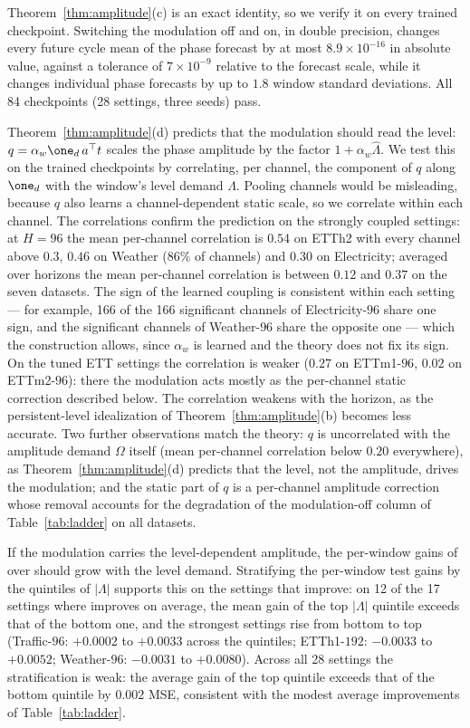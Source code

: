 {
Theorem~\ref{thm:amplitude}(c) is an exact identity, so we verify it on every trained \sysLA checkpoint. Switching the modulation off and on, in double precision, changes every future cycle mean of the phase forecast by at most $8.9\times10^{-16}$ in absolute value, against a tolerance of $7\times10^{-9}$ relative to the forecast scale, while it changes individual phase forecasts by up to $1.8$ window standard deviations. All 84 checkpoints (28 settings, three seeds) pass.

Theorem~\ref{thm:amplitude}(d) predicts that the modulation should read the level: $q=\alpha_w\one_d\,a^\top t$ scales the phase amplitude by the factor $1+\alpha_w\hat\Lambda$. We test this on the trained checkpoints by correlating, per channel, the component of $q$ along $\one_d$ with the window's level demand $\Lambda$. Pooling channels would be misleading, because $q$ also learns a channel-dependent static scale, so we correlate within each channel. The correlations confirm the prediction on the strongly coupled settings: at $H=96$ the mean per-channel correlation is $0.54$ on ETTh2 with every channel above $0.3$, $0.46$ on Weather (86\% of channels) and $0.30$ on Electricity; averaged over horizons the mean per-channel correlation is between $0.12$ and $0.37$ on the seven datasets. The sign of the learned coupling is consistent within each setting --- for example, 166 of the 166 significant channels of Electricity-$96$ share one sign, and the significant channels of Weather-$96$ share the opposite one --- which the construction allows, since $\alpha_w$ is learned and the theory does not fix its sign. On the tuned ETT settings the correlation is weaker ($0.27$ on ETTm1-$96$, $0.02$ on ETTm2-$96$): there the modulation acts mostly as the per-channel static correction described below. The correlation weakens with the horizon, as the persistent-level idealization of Theorem~\ref{thm:amplitude}(b) becomes less accurate. Two further observations match the theory: $q$ is uncorrelated with the amplitude demand $\Omega$ itself (mean per-channel correlation below $0.20$ everywhere), as Theorem~\ref{thm:amplitude}(d) predicts that the level, not the amplitude, drives the modulation; and the static part of $q$ is a per-channel amplitude correction whose removal accounts for the degradation of the modulation-off column of Table~\ref{tab:ladder} on all datasets.

If the modulation carries the level-dependent amplitude, the per-window gains of \sysLA over \sysL should grow with the level demand. Stratifying the per-window test gains by the quintiles of $|\Lambda|$ supports this on the settings that improve: on 12 of the 17 settings where \sysLA improves on average, the mean gain of the top $|\Lambda|$ quintile exceeds that of the bottom one, and the strongest settings rise from bottom to top (Traffic-$96$: $+0.0002$ to $+0.0033$ across the quintiles; ETTh1-$192$: $-0.0033$ to $+0.0052$; Weather-$96$: $-0.0031$ to $+0.0080$). Across all 28 settings the stratification is weak: the average gain of the top quintile exceeds that of the bottom quintile by $0.002$ MSE, consistent with the modest average improvements of Table~\ref{tab:ladder}.

}

